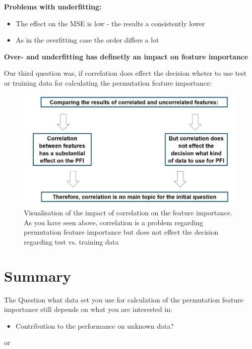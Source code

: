 \documentclass[
]{krantz}
\providecommand{\tightlist}{%
  \setlength{\itemsep}{0pt}\setlength{\parskip}{0pt}}
\begin{document}
\textbf{Problems with underfitting:}

\begin{itemize}
\tightlist
\item
  The effect on the MSE is low - the results a consistently lower
\item
  As in the overfitting case the order differs a lot
\end{itemize}

\textbf{Over- and underfitting has definetly an impact on feature importance}

Our third question was, if correlation does effect the decision wheter to use test or training data for calculating the permutation feature importance:

\begin{figure}

{\centering \includegraphics[width=0.7\linewidth]{images/summary_correlation} 

}

\caption{Visualisation of the impact of correlation on the feature importance. As you have seen above, correlation is a problem regarding permutation feature importance but does not effect the decision regarding test vs. training data}\label{fig:unnamed-chunk-60}
\end{figure}

\hypertarget{summary-2}{%
\section{Summary}\label{summary-2}}

The Question what data set you use for calculation of the permutation feature importance still depends on what you are interested in:

\begin{itemize}
\tightlist
\item
  Contribution to the performance on unknown data?
\end{itemize}

or
\end{document}
